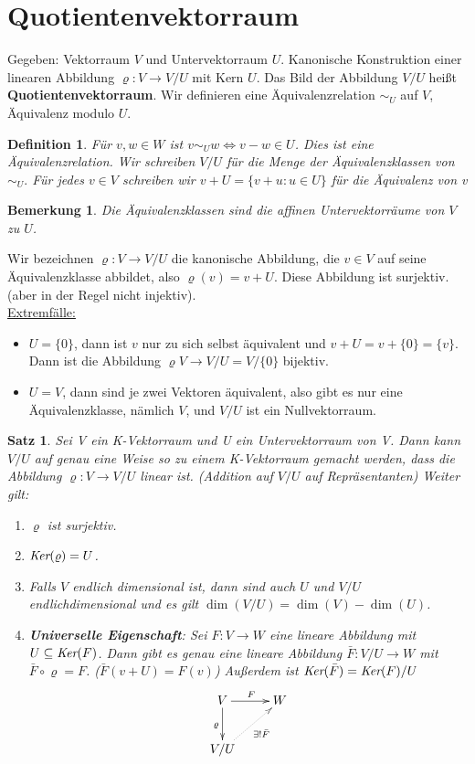 \documentclass[12pt,a4paper]{article}
\theoremstyle{plain}
\newtheorem{Satz}[Theorem]{Satz}
\newtheorem{Definition}[Theorem]{Definition}
\newtheorem{Bemerkung}[Theorem]{Bemerkung}
\newcommand{\herv}[1]{{\emph{\textbf{#1}}}}
\numberwithin{equation}{section}
\begin{document}
\section{Quotientenvektorraum}
Gegeben: Vektorraum $V$ und Untervektorraum $U$. Kanonische Konstruktion einer linearen Abbildung $\varrho : V \rightarrow V/U$ mit Kern $U$. Das Bild der Abbildung $V/U$ heißt \textbf{Quotientenvektorraum}. Wir definieren eine Äquivalenzrelation $\sim_U$ auf $V$, \glqq Äquivalenz modulo $U$\grqq.
\begin{Definition}
Für $v,w\in W$ ist $v\sim_U w \Leftrightarrow v-w \in U$. Dies ist eine Äquivalenzrelation. Wir schreiben $V/U$ für die Menge der Äquivalenzklassen von $\sim_U.$ Für jedes $v\in V$ schreiben wir $v+U=\{v+u:u\in U\}$ für die Äquivalenz von v
\end{Definition}
\begin{Bemerkung}
Die Äquivalenzklassen sind die affinen Untervektorräume von $V$ zu $U$.
\end{Bemerkung}
Wir bezeichnen $\varrho:V\rightarrow V/U$ die kanonische Abbildung, die $v\in V$ auf seine Äquivalenzklasse abbildet, also $\varrho(v)=v+U$. Diese Abbildung ist surjektiv. (aber in der Regel nicht injektiv). \\
\underline{Extremfälle:} \begin{itemize}
\item $U=\{0\}$, dann ist $v$ nur zu sich selbst äquivalent und $v+U=v+\{0\}=\{v\}$. Dann ist die Abbildung $\varrho V\rightarrow V/U=V/\{0\}$ bijektiv.
\item $U=V$, dann sind je zwei Vektoren äquivalent, also gibt es nur eine Äquivalenzklasse, nämlich $V$, und $V/U$ ist ein Nullvektorraum.
\end{itemize}
\begin{Satz}
Sei V ein K-Vektorraum und U ein Untervektorraum von V. Dann kann $V/U$ auf genau eine Weise so zu einem K-Vektorraum gemacht werden, dass die Abbildung $\varrho:V\rightarrow V/U$ linear ist. (Addition auf $V/U$ auf Repräsentanten) Weiter gilt:
\begin{enumerate}
\renewcommand{\labelenumi}{\emph{\arabic{enumi})}}
\item $\varrho$ ist surjektiv.
\item $\emph{Ker}(\varrho)=U$.
\item Falls $V$ endlich dimensional ist, dann sind auch $U$ und $V/U$ endlichdimensional und es gilt $\dim(V/U)=\dim(V)-\dim(U)$.
\item \herv{Universelle Eigenschaft}: Sei $F:V\rightarrow W$ eine lineare Abbildung mit $U\subseteq \emph{Ker}(F)$. Dann gibt es genau eine lineare Abbildung $\bar{F}:V/U\rightarrow W$ mit $\bar{F}\circ \varrho=F$. ($\bar{F}(v+U)=F(v)$) Außerdem ist $\emph{Ker}(\bar{F})=\emph{Ker}(F)/U$
\[ \begin{xy}
	\xymatrix{
		V \ar[r]^F \ar[d]_\varrho & W \\
		V/U \ar@{.>}[ru]_{\exists ! \bar{F}}
	}
\end{xy} \]
\end{enumerate}
\end{Satz}
\end{document}
